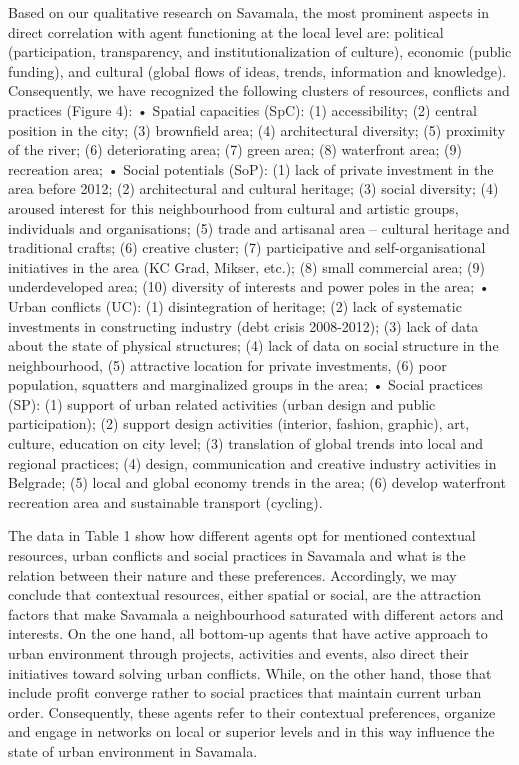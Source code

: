 \documentclass[11pt]{report}
\begin{document}
Based on our qualitative research on Savamala, the most prominent aspects in direct correlation with agent functioning at the local level are: political (participation, transparency, and institutionalization of culture), economic (public funding), and cultural (global flows of ideas, trends, information and knowledge). Consequently, we have recognized the following clusters of resources, conflicts and practices (Figure 4):
•	Spatial capacities (SpC):  (1) accessibility; (2) central position in the city; (3) brownfield area; (4) architectural diversity; (5) proximity of the river; (6) deteriorating area; (7) green area; (8) waterfront area; (9) recreation area;
•	Social potentials (SoP): (1) lack of private investment in the area before 2012; (2) architectural and cultural heritage; (3) social diversity; (4) aroused interest for this neighbourhood from cultural and artistic groups, individuals and organisations; (5) trade and artisanal area – cultural heritage and traditional crafts; (6) creative cluster; (7) participative and self-organisational initiatives in the area (KC Grad, Mikser, etc.); (8) small commercial area; (9) underdeveloped area; (10) diversity of interests and power poles in the area;
•	Urban conflicts (UC): (1) disintegration of heritage; (2) lack of systematic investments in constructing industry (debt crisis 2008-2012); (3) lack of data about the state of physical structures; (4) lack of data on social structure in the neighbourhood, (5) attractive location for private investments, (6) poor population, squatters and marginalized groups in the area;
•	Social practices (SP): (1) support of urban related activities (urban design and public participation); (2) support design activities (interior, fashion, graphic), art, culture, education on city level; (3) translation of global trends into local and regional practices; (4) design, communication and creative industry activities in Belgrade; (5) local and global economy trends in the area; (6) develop waterfront recreation area and sustainable transport (cycling).

The data in Table 1 show how different agents opt for mentioned contextual resources, urban conflicts and social practices in Savamala and what is the relation between their nature and these preferences. Accordingly, we may conclude that contextual resources, either spatial or social, are the attraction factors that make Savamala a neighbourhood saturated with different actors and interests. On the one hand, all bottom-up agents that have active approach to urban environment through projects, activities and events, also direct their initiatives toward solving urban conflicts. While, on the other hand, those that include profit converge rather to social practices that maintain current urban order. Consequently, these agents refer to their contextual preferences, organize and engage in networks on local or superior levels and in this way influence the state of urban environment in Savamala.
\end{document}
